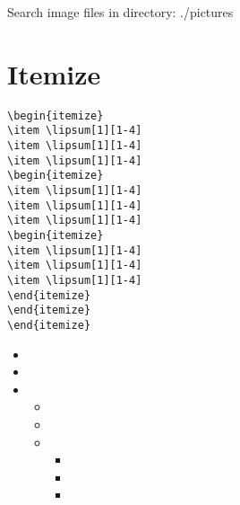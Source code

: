 \begin{attentionbox}
Search image files in directory: ./pictures\\
\end{attentionbox}


\section{Itemize}
\begin{highlightbox}
\begin{verbatim}
\begin{itemize}
\item \lipsum[1][1-4] 
\item \lipsum[1][1-4] 
\item \lipsum[1][1-4] 
\begin{itemize}
\item \lipsum[1][1-4] 
\item \lipsum[1][1-4] 
\item \lipsum[1][1-4] 
\begin{itemize}
\item \lipsum[1][1-4] 
\item \lipsum[1][1-4] 
\item \lipsum[1][1-4] 
\end{itemize}
\end{itemize}
\end{itemize}
\end{verbatim}
\end{highlightbox}

\begin{itemize}
\item \lipsum[1][1-4] 
\item \lipsum[1][1-4] 
\item \lipsum[1][1-4] 
\begin{itemize}
\item \lipsum[1][1-4] 
\item \lipsum[1][1-4] 
\item \lipsum[1][1-4] 
\begin{itemize}
\item \lipsum[1][1-4] 
\item \lipsum[1][1-4] 
\item \lipsum[1][1-4] 
\end{itemize}
\end{itemize}
\end{itemize}

